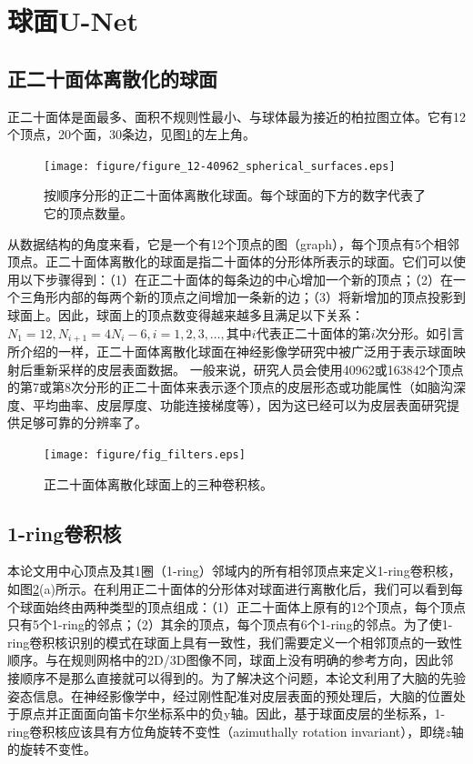 \section{球面U-Net}\label{sec:球面U-Net}
\subsection{正二十面体离散化的球面}\label{sec:正二十面体离散化的球面}
正二十面体是面最多、面积不规则性最小、与球体最为接近的柏拉图立体\cite{PlatonicSolid}。它有12个顶点，20个面，30条边，见图\ref{fig:figure_12-40962_spherical_surfaces}的左上角。
\begin{figure}[h]
    \centering
    \texttt{[image: figure/figure\_12-40962\_spherical\_surfaces.eps]}
    \caption{\label{fig:figure_12-40962_spherical_surfaces}按顺序分形的正二十面体离散化球面。每个球面的下方的数字代表了它的顶点数量。}
\end{figure}从数据结构的角度来看，它是一个有12个顶点的图（graph），每个顶点有5个相邻顶点。正二十面体离散化的球面是指二十面体的分形体所表示的球面。它们可以使用以下步骤得到：（1）在正二十面体的每条边的中心增加一个新的顶点；（2）在一个三角形内部的每两个新的顶点之间增加一条新的边；（3）将新增加的顶点投影到球面上。因此，球面上的顶点数变得越来越多且满足以下关系：$N_1=12,N_{i+1}=4N_i-6,i=1,2,3,\dots,$其中$i$代表正二十面体的第$i$次分形。如引言所介绍的一样，正二十面体离散化球面在神经影像学研究中被广泛用于表示球面映射后重新采样的皮层表面数据\cite{fischl2012freesurfer}。
一般来说，研究人员会使用40962或163842个顶点的第7或第8次分形的正二十面体来表示逐个顶点的皮层形态或功能属性（如脑沟深度、平均曲率、皮层厚度、功能连接梯度等），因为这已经可以为皮层表面研究提供足够可靠的分辨率了。

\begin{figure}[h]
	\centering
	\texttt{[image: figure/fig\_filters.eps]}
	\caption{正二十面体离散化球面上的三种卷积核。}
	\label{fig:fig_filters}
\end{figure}

\subsection{1-ring卷积核}\label{sec:1-ring卷积核}
本论文用中心顶点及其1圈（1-ring）邻域内的所有相邻顶点来定义1-ring卷积核，如图\ref{fig:fig_filters}(a)所示。在利用正二十面体的分形体对球面进行离散化后，我们可以看到每个球面始终由两种类型的顶点组成：（1）正二十面体上原有的12个顶点，每个顶点只有5个1-ring的邻点；（2）其余的顶点，每个顶点有6个1-ring的邻点。为了使1-ring卷积核识别的模式在球面上具有一致性，我们需要定义一个相邻顶点的一致性顺序。与在规则网格中的2D/3D图像不同，球面上没有明确的参考方向，因此邻接顺序不是那么直接就可以得到的。为了解决这个问题，本论文利用了大脑的先验姿态信息。在神经影像学中，经过刚性配准\cite{greve2009accurate}对皮层表面的预处理后，大脑的位置处于原点并正面面向笛卡尔坐标系中的负y轴。因此，基于球面皮层的坐标系，1-ring卷积核应该具有方位角旋转不变性（azimuthally rotation invariant），即绕$z$轴的旋转不变性。

